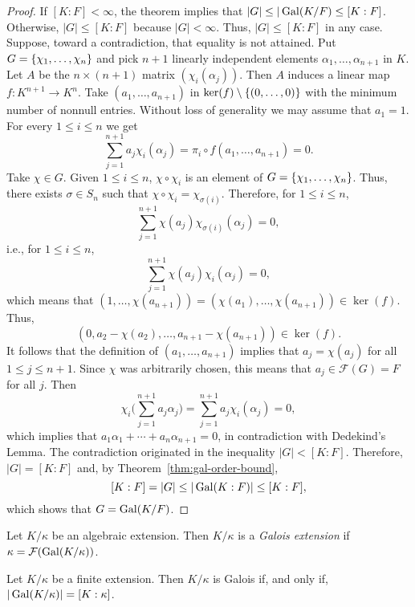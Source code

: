 \begin{proof}
    If $[K:F]<\infty$, the theorem implies that $|G|\le|\operatorname{Gal}(K/F)\le[K:F]$. Otherwise, $|G|\le[K:F]$ because $|G|<\infty$. Thus, $|G|\le[K:F]$ in any case. Suppose, toward a contradiction, that equality is not attained. Put $G=\{\chi_1,\dots,\chi_n\}$ and pick $n+1$ linearly independent elements $\alpha_1,\dots,\alpha_{n+1}$ in $K$. Let $A$ be the $n\times(n+1)$ matrix $(\chi_i(\alpha_j))$. Then $A$ induces a linear map $f\colon K^{n+1}\to K^n$. Take $(a_1,\dots,a_{n+1})$ in $\ker(f)\setminus\{(0,\dots,0)\}$ with the minimum number of nonnull entries. Without loss of generality we may assume that $a_1=1$. For every $1\le i\le n$ we get
    \begin{equation}\label{eq:K-linear-dependence}
        \sum_{j=1}^{n+1}a_j\chi_i(\alpha_j)=\pi_i\circ f(a_1,\dots,a_{n+1})=0.
    \end{equation}
    Take $\chi\in G$. Given $1\le i\le n$, $\chi\circ\chi_i$ is an element of $G=\{\chi_1,\dots,\chi_n\}$. Thus, there exists $\sigma\in S_n$ such that $\chi\circ\chi_i=\chi_{\sigma(i)}$. Therefore, for $1\le i\le n$,
    $$
        \sum_{j=1}^{n+1}\chi(a_j)\chi_{\sigma(i)}(\alpha_j)=0,
    $$
    i.e., for $1\le i\le n$,
    $$
        \sum_{j=1}^{n+1}\chi(a_j)\chi_i(\alpha_j)=0,
    $$
    which means that $(1,\dots,\chi(a_{n+1}))=(\chi(a_1),\dots,\chi(a_{n+1}))\in\ker(f)$. Thus,
    $$
        (0,a_2-\chi(a_2),\dots,a_{n+1}-\chi(a_{n+1}))\in\ker(f).
    $$
    It follows that the definition of $(a_1,\dots,a_{n+1})$ implies that $a_j=\chi(a_j)$ for all $1\le j\le n+1$. Since $\chi$ was arbitrarily chosen, this means that $a_j\in\mathcal F(G)=F$ for all $j$. Then
    $$
        \chi_i\bigg(\sum_{j=1}^{n+1}a_j\alpha_j\bigg)
            = \sum_{j=1}^{n+1}a_j\chi_i(\alpha_j)
            = 0,
    $$
    which implies that $a_1\alpha_1+\cdots+a_n\alpha_{n+1}=0$, in contradiction with Dedekind's Lemma. The contradiction originated in the inequality $|G|<[K:F]$. Therefore, $|G|=[K:F]$ and, by Theorem~\ref{thm:gal-order-bound}, 
    $$
        [K:F]=|G|\le|\operatorname{Gal}(K:F)|\le[K:F],
    $$
    which shows that $G=\operatorname{Gal}(K/F)$.
\end{proof}

\begin{defn}
    Let\/ $K/\kappa$ be an algebraic extension. Then\/ $K/\kappa$ is a \textsl{Galois extension\/} if\/ $\kappa= \mathcal F(\operatorname{Gal}(K/\kappa))$.
\end{defn}

\begin{cor}\label{cor:galois-iff-order=dim}
    Let\/ $K/\kappa$ be a finite extension. Then\/ $K/\kappa$ is Galois if, and only if, $|\operatorname{Gal}(K/\kappa)|=[K:\kappa]$.
\end{cor}

